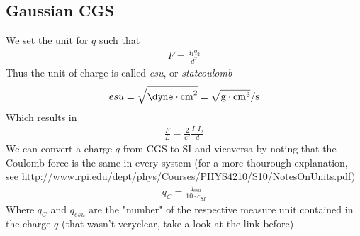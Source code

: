 \documentclass[a4paper, twocolumn]{article}
\begin{document}
\subsection{Gaussian CGS}
\label{sec:gaussian-cgs}
We set the unit for $q$ such that
\begin{align}
  \label{eq:29}
  F=\frac{q_1 q_2}{d^2}
\end{align}
Thus the unit of charge is called \emph{esu}, or \emph{statcoulomb}
\begin{align}
  \label{eq:30}
  esu=\sqrt{\si{\dyne\cdot\cm^2} }=\si{\sqrt{\g\cdot\cm^3}\per\s}
\end{align}
Which results in
\begin{align}
  \label{eq:31}
  \frac{F}{L}=\frac{2}{c^2}\frac{I_1 I_2}{d}
\end{align}
We can convert a charge $q$ from CGS to SI and viceversa by noting that the Coulomb force is the same in every system (for a more thourough explanation, see \url{http://www.rpi.edu/dept/phys/Courses/PHYS4210/S10/NotesOnUnits.pdf})
\begin{align}
  \label{eq:32}
  q_{C}=\frac{q_{esu}}{10\cdot c_{SI}}
\end{align}
Where $q_C$ and $q_{esu}$ are the "number" of the respective measure unit contained in the charge $q$ (that wasn't veryclear, take a look at the link before)
\end{document}
